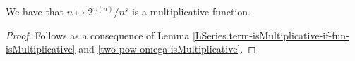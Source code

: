 \begin{theorem}
\label{two_pow_omega_LSeries.term_isMultiplicative}
\leanok
We have that $n\mapsto 2^{\omega(n)}/n^{s}$ is a multiplicative function.
\end{theorem}
\begin{proof}
\leanok
Follows as a consequence of Lemma \ref{LSeries.term-isMultiplicative-if-fun-isMultiplicative}
    and \ref{two-pow-omega-isMultiplicative}.
\end{proof}
